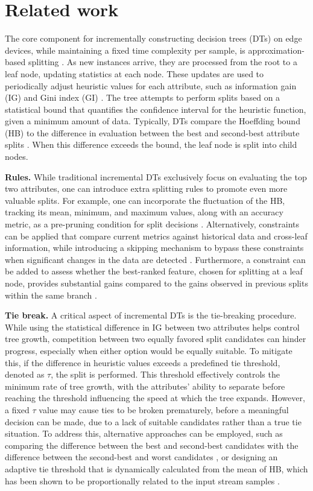 \section{Related work}
\label{sec:related}

The core component for incrementally constructing decision trees (DTs) on edge devices, while maintaining a fixed time complexity per sample, is approximation-based splitting \cite{domingos2000mining}. As new instances arrive, they are processed from the root to a leaf node, updating statistics at each node. These updates are used to periodically adjust heuristic values for each attribute, such as information gain (IG) and Gini index (GI) \cite{domingos2000mining}. The tree attempts to perform splits based on a statistical bound that quantifies the confidence interval for the heuristic function, given a minimum amount of data. Typically, DTs compare the Hoeffding bound (HB) to the difference in evaluation between the best and second-best attribute splits \cite{domingos2000mining}. When this difference exceeds the bound, the leaf node is split into child nodes.

\textbf{Rules.} While traditional incremental DTs exclusively focus on evaluating the top two attributes, one can introduce extra splitting rules to promote even more valuable splits. For example, one can incorporate the fluctuation of the HB, tracking its mean, minimum, and maximum values, along with an accuracy metric, as a pre-pruning condition for split decisions \cite{yang2011optimized}. Alternatively, constraints can be applied that compare current metrics against historical data and cross-leaf information, while introducing a skipping mechanism to bypass these constraints when significant changes in the data are detected \cite{da2018strict}. Furthermore, a constraint can be added to assess whether the best-ranked feature, chosen for splitting at a leaf node, provides substantial gains compared to the gains observed in previous splits within the same branch \cite{barddal2020regularized}.

\textbf{Tie break.} A critical aspect of incremental DTs is the tie-breaking procedure. While using the statistical difference in IG between two attributes helps control tree growth, competition between two equally favored split candidates can hinder progress, especially when either option would be equally suitable. To mitigate this, if the difference in heuristic values exceeds a predefined tie threshold, denoted as $\tau$, the split is performed. This threshold effectively controls the minimum rate of tree growth, with the attributes’ ability to separate before reaching the threshold influencing the speed at which the tree expands. However, a fixed $\tau$ value may cause ties to be broken prematurely, before a meaningful decision can be made, due to a lack of suitable candidates rather than a true tie situation. To address this, alternative approaches can be employed, such as comparing the difference between the best and second-best candidates with the difference between the second-best and worst candidates \cite{holmes2005tie}, or designing an adaptive tie threshold that is dynamically calculated from the mean of HB, which has been shown to be proportionally related to the input stream samples \cite{yang2011moderated}.

